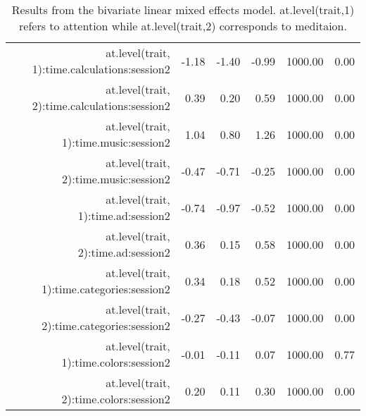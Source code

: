 \begin{table}[ht]
\begin{tabular}{rrrrrr}
  at.level(trait, 1):time.calculations:session2 & -1.18 & -1.40 & -0.99 & 1000.00 & 0.00 \\ 
  at.level(trait, 2):time.calculations:session2 & 0.39 & 0.20 & 0.59 & 1000.00 & 0.00 \\ 
  at.level(trait, 1):time.music:session2 & 1.04 & 0.80 & 1.26 & 1000.00 & 0.00 \\ 
  at.level(trait, 2):time.music:session2 & -0.47 & -0.71 & -0.25 & 1000.00 & 0.00 \\ 
  at.level(trait, 1):time.ad:session2 & -0.74 & -0.97 & -0.52 & 1000.00 & 0.00 \\ 
  at.level(trait, 2):time.ad:session2 & 0.36 & 0.15 & 0.58 & 1000.00 & 0.00 \\ 
  at.level(trait, 1):time.categories:session2 & 0.34 & 0.18 & 0.52 & 1000.00 & 0.00 \\ 
  at.level(trait, 2):time.categories:session2 & -0.27 & -0.43 & -0.07 & 1000.00 & 0.00 \\ 
  at.level(trait, 1):time.colors:session2 & -0.01 & -0.11 & 0.07 & 1000.00 & 0.77 \\ 
  at.level(trait, 2):time.colors:session2 & 0.20 & 0.11 & 0.30 & 1000.00 & 0.00 \\ 
   \hline
\end{tabular}
\caption{Results from the bivariate
               linear mixed effects model. at.level(trait,1) refers to attention while 
               at.level(trait,2) corresponds to meditaion.} 
\label{tab:bivariate}
\end{table}
